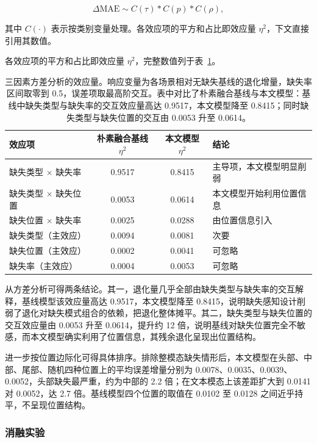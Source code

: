 \documentclass[withoutpreface,bwprint]{cumcmthesis}
\begin{document}
\begin{equation}
\Delta\mathrm{MAE}\sim
C(\tau)\ast C(p)\ast C(\rho),
\label{eq:anova}
\end{equation}

其中 $C(\cdot)$ 表示按类别变量处理。各效应项的平方和占比即效应量 $\eta^2$，下文直接引用其数值。

各效应项的平方和占比即效应量 $\eta^2$，完整数值列于表~\ref{tab:anova}。

\begin{table}[H]
\centering
  \caption{三因素方差分析的效应量。响应变量为各场景相对无缺失基线的退化增量，缺失率区间取零到 0.5，误差项取最高阶交互。表中对比了朴素融合基线与本文模型：基线中缺失类型与缺失率的交互效应量高达 0.9517，本文模型降至 0.8415；同时缺失类型与缺失位置的交互由 0.0053 升至 0.0614。}
\label{tab:anova}
\begin{tabular}{lccl}
\toprule
效应项 & 朴素融合基线 $\eta^2$ & 本文模型 $\eta^2$ & 结论 \\
\midrule
缺失类型 $\times$ 缺失率 & 0.9517 & 0.8415 & 主导项，本文模型明显削弱 \\
缺失类型 $\times$ 缺失位置 & 0.0053 & 0.0614 & 本文模型开始利用位置信息 \\
缺失位置 $\times$ 缺失率 & 0.0025 & 0.0288 & 由位置信息引入 \\
缺失类型（主效应） & 0.0094 & 0.0081 & 次要 \\
缺失位置（主效应） & 0.0002 & 0.0041 & 可忽略 \\
缺失率（主效应） & 0.0004 & 0.0053 & 可忽略 \\
\bottomrule
\end{tabular}
\end{table}
从方差分析可得两条结论。其一，退化量几乎全部由缺失类型与缺失率的交互解释，基线模型该效应量高达 0.9517，本文模型降至 0.8415，说明缺失感知设计削弱了退化对缺失模式组合的依赖，把退化整体摊平。其二，缺失类型与缺失位置的交互效应量由 0.0053 升至 0.0614，提升约 12 倍，说明基线对缺失位置完全不敏感，而本文模型确实利用了位置信息，其残余退化呈现出位置结构。

进一步按位置边际化可得具体排序。排除整模态缺失情形后，本文模型在头部、中部、尾部、随机四种位置上的平均误差增量分别为 0.0078、0.0035、0.0039、0.0052，头部缺失最严重，约为中部的 2.2 倍；在文本模态上该差距扩大到 0.0141 对 0.0052，达 2.7 倍。基线模型四个位置的取值在 0.0102 至 0.0128 之间近乎持平，不呈现位置结构。

\subsubsection{消融实验}
\end{document}
